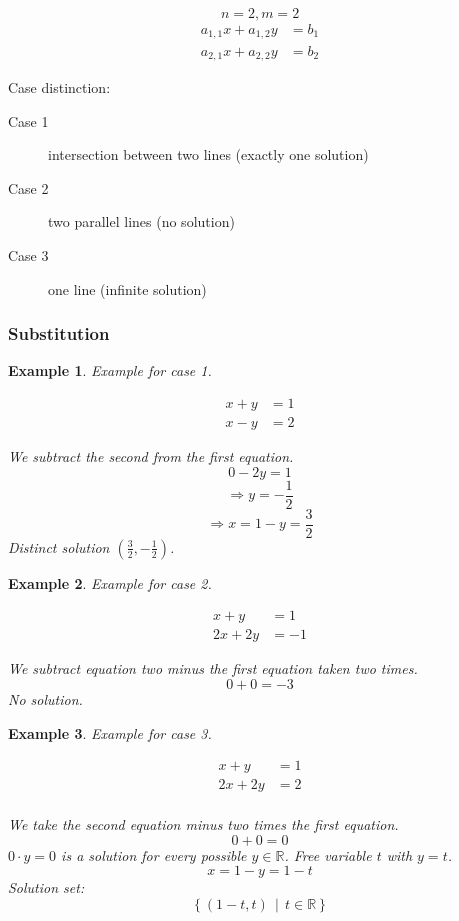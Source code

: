 \documentclass[a4paper,landscape,twocolumn]{article}
\newcommand\setdef[2]{\left\{#1\,\middle|\,#2\right\}}
\newtheorem{ex}{Example}
\begin{document}
\[ n = 2, m = 2 \]
\begin{align*}
  a_{1,1} x + a_{1,2} y &= b_1 \\
  a_{2,1} x + a_{2,2} y &= b_2
\end{align*}

Case distinction:
\begin{description}
  \item[Case 1]
    intersection between two lines (exactly one solution)
  \item[Case 2]
    two parallel lines (no solution)
  \item[Case 3]
    one line (infinite solution)
\end{description}

\subsubsection{Substitution}

\begin{ex}
  Example for case 1.

  \begin{align*}
    x + y &= 1 \\
    x - y &= 2
  \end{align*}

  We subtract the second from the first equation.
  \[ 0 - 2y = 1 \]
  \[ \Rightarrow y = -\frac12 \]
  \[ \Rightarrow x = 1 - y = \frac32 \]
  Distinct solution $(\frac32, -\frac12)$.
\end{ex}

\begin{ex}
  Example for case 2.

  \begin{align*}
     x +  y &= 1 \\
    2x + 2y &= -1
  \end{align*}

  We subtract equation two minus the first equation taken two times.
  \[ 0 + 0 = -3 \]
  No solution.
\end{ex}

\begin{ex}
  Example for case 3.

  \begin{align*}
    x + y &= 1 \\
    2x + 2y &= 2 \\
  \end{align*}

  We take the second equation minus two times the first equation.
  \[ 0 + 0 = 0 \]
  $0 \cdot y = 0$ is a solution for every possible $y \in \mathbb{R}$.
  Free variable $t$ with $y = t$.
  \[ x = 1 - y = 1 - t \]
  Solution set:
  \[ \setdef{(1 - t, t)}{t \in \mathbb{R}} \]
\end{ex}
\end{document}
